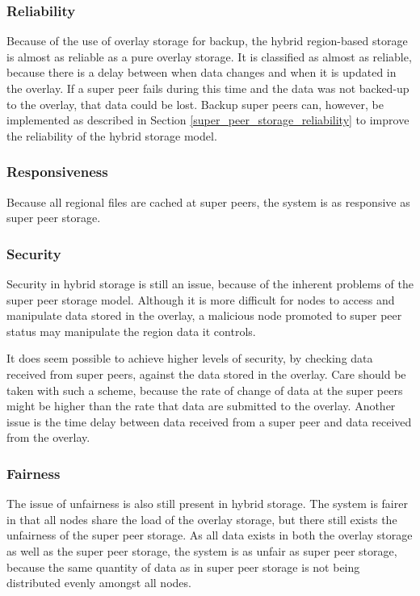 \documentclass[10pt,a4paper,journal,cspaper,compsoc]{IEEEtran}
\begin{document}
\subsubsection{Reliability}
\label{hybrid_storage_reliability}

Because of the use of overlay storage for backup, the hybrid region-based storage is almost as reliable as a pure overlay storage. It is classified
as almost as reliable, because there is a delay between when data changes and when it is updated in the overlay. If a super peer fails during this
time and the data was not backed-up to the overlay, that data could be lost. Backup super peers can, however, be implemented as described in Section
\ref{super_peer_storage_reliability} to improve the reliability of the hybrid storage model.

\subsubsection{Responsiveness}

Because all regional files are cached at super peers, the system is as responsive as super peer storage.

\subsubsection{Security}

Security in hybrid storage is still an issue, because of the inherent problems of the super peer storage model. Although it is more difficult for
nodes to access and manipulate data stored in the overlay, a malicious node promoted to super peer status may manipulate the region data it controls.

It does seem possible to achieve higher levels of security, by checking data received from super peers, against the data stored in the overlay. Care
should be taken with such a scheme, because the rate of change of data at the super peers might be higher than the rate that data are submitted to
the overlay. Another issue is the time delay between data received from a super peer and data received from the overlay.

\subsubsection{Fairness}

The issue of unfairness is also still present in hybrid storage. The system is fairer in that all nodes share the load of the overlay storage, but
there still exists the unfairness of the super peer storage. As all data exists in both the overlay storage as well as the super peer storage, the
system is as unfair as super peer storage, because the same quantity of data as in super peer storage is not being distributed evenly amongst all
nodes.
\end{document}
